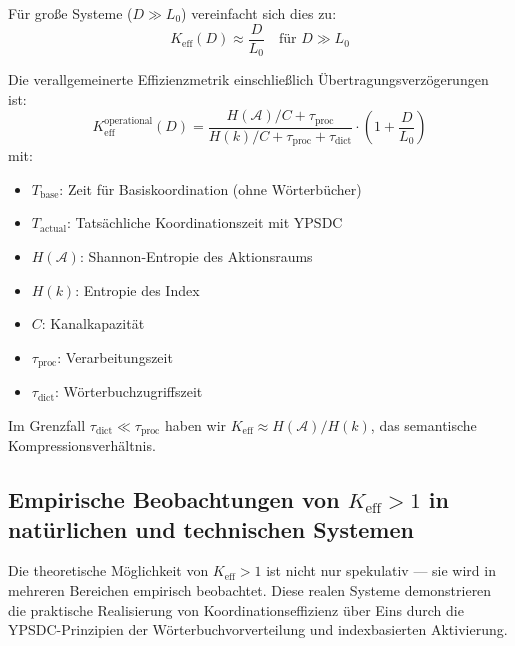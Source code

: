 \documentclass[11pt,a4paper]{article}
\begin{document}
	Für große Systeme ($D \gg L_0$) vereinfacht sich dies zu:
	\begin{equation}
		K_{\mathrm{eff}}(D) \approx \frac{D}{L_0} \quad \text{für } D \gg L_0
	\end{equation}
	
	Die verallgemeinerte Effizienzmetrik einschließlich Übertragungsverzögerungen ist:
	\begin{equation}
		K_{\mathrm{eff}}^{\text{operational}}(D) = \frac{H(\mathcal{A})/C + \tau_{\text{proc}}}{H(k)/C + \tau_{\text{proc}} + \tau_{\text{dict}}} \cdot \left(1 + \frac{D}{L_0}\right)
	\end{equation}
	mit:
	\begin{itemize}
		\item $T_{\text{base}}$: Zeit für Basiskoordination (ohne Wörterbücher)
		\item $T_{\text{actual}}$: Tatsächliche Koordinationszeit mit YPSDC
		\item $H(\mathcal{A})$: Shannon-Entropie des Aktionsraums
		\item $H(k)$: Entropie des Index
		\item $C$: Kanalkapazität
		\item $\tau_{\text{proc}}$: Verarbeitungszeit
		\item $\tau_{\text{dict}}$: Wörterbuchzugriffszeit
	\end{itemize}
	
	Im Grenzfall $\tau_{\text{dict}} \ll \tau_{\text{proc}}$ haben wir $K_{\mathrm{eff}} \approx H(\mathcal{A})/H(k)$, das semantische Kompressionsverhältnis.
	
	\subsection{Empirische Beobachtungen von $K_{\mathrm{eff}} > 1$ in natürlichen und technischen Systemen}
	\label{sec:empirical-keff}
	
	Die theoretische Möglichkeit von $K_{\mathrm{eff}} > 1$ ist nicht nur spekulativ — sie wird in mehreren Bereichen empirisch beobachtet. Diese realen Systeme demonstrieren die praktische Realisierung von Koordinationseffizienz über Eins durch die YPSDC-Prinzipien der Wörterbuchvorverteilung und indexbasierten Aktivierung.
	
\end{document}
